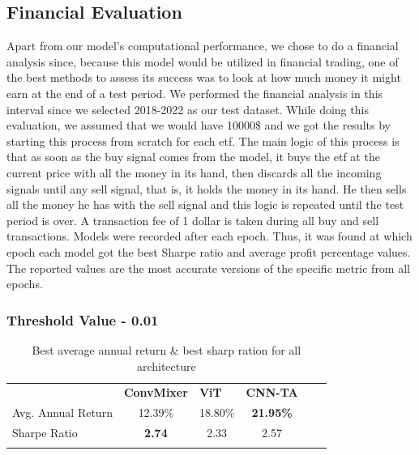 \documentclass[]{article}
\begin{document}
\noindent

\subsection{Financial Evaluation}
Apart from our model's computational performance, we chose to do a financial analysis since, because this model would be utilized in financial trading, one of the best methods to assess its success was to look at how much money it might earn at the end of a test period. We performed the financial analysis in this interval since we selected 2018-2022 as our test dataset.
While doing this evaluation, we assumed that we would have 10000\$ and we got the results by starting this process from scratch for each etf. The main logic of this process is that as soon as the buy signal comes from the model, it buys the etf at the current price with all the money in its hand, then discards all the incoming signals until any sell signal, that is, it holds the money in its hand. He then sells all the money he has with the sell signal and this logic is repeated until the test period is over. A transaction fee of 1 dollar is taken during all buy and sell transactions.
Models were recorded after each epoch. Thus, it was found at which epoch each model got the best Sharpe ratio and average profit percentage values. The reported values are the most accurate versions of the specific metric from all epochs.

\subsubsection{Threshold Value - 0.01}
\begin{table}[H]
    \centering
    \caption{Best average annual return \& best sharp ration for all architecture}
    \begin{tabular}{lcccll}
        \cline{1-4}
        \multicolumn{1}{|l|}{} & \multicolumn{1}{l|}{\textbf{ConvMixer}} & \multicolumn{1}{l|}{\textbf{ViT}} & \multicolumn{1}{l|}{\textbf{CNN-TA}} & & \\ \cline{1-4} \multicolumn{1}{|l|}{Avg. Annual Return} & \multicolumn{1}{c|}{12.39\%} & \multicolumn{1}{c|}{18.80\%} & \multicolumn{1}{c|}{\textbf{21.95\%}} & & \\\cline{1-4} \multicolumn{1}{|l|}{Sharpe Ratio} & \multicolumn{1}{c|}{\textbf{2.74}} & \multicolumn{1}{c|}{2.33} & \multicolumn{1}{c|}{2.57} &  &  \\\cline{1-4} \multicolumn{1}{l}{} & \multicolumn{1}{l}{} & \multicolumn{1}{l}{} & &
    \end{tabular}
\end{table}
\noindent
\end{document}
